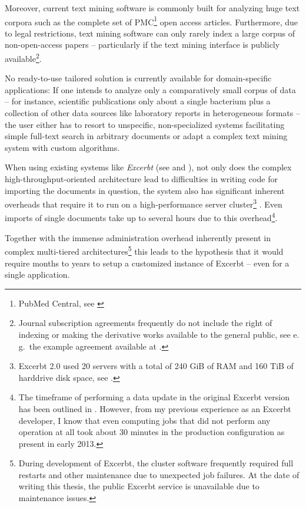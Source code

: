 \documentclass[a4paper, 12pt, twoside, reqn]{report}
\numberwithin{figure}{chapter}
\newtheorem[L]{boxedDefinition}{Definition}
\newtheorem[L]{boxedExample}{Example}
\newcommand{\eg}{e.\,g.\ }
\begin{document}
Moreover, current text mining software is commonly built for analyzing huge text corpora such as the complete set of PMC\footnote{PubMed Central, see \cite{beck2010report}} open access articles. Furthermore, due to legal restrictions, text mining software can only rarely index a large corpus of non-open-access papers -- particularly if the text mining interface is publicly available\footnote{Journal subscription agreements frequently do not include the right of indexing or making the derivative works available to the general public, see \eg the example agreement available at \cite{sciencedirect2012}.}.

No ready-to-use tailored solution is currently available for domain-specific applications: If one intends to analyze only a comparatively small corpus of data -- for instance, scientific publications only about a single bacterium plus a collection of other data sources like laboratory reports in heterogeneous formats -- the user either has to resort to unspecific, non-specialized systems facilitating simple full-text search in arbitrary documents or adapt a complex text mining system with custom algorithms.

When using existing systems like \textit{Excerbt} (see \cite{barnickel2009large} and \cite{wachinger2013next}), not only does the complex high-throughput-oriented architecture lead to difficulties in writing code for importing the documents in question, the system also has significant inherent overheads that require it to run on a high-performance server cluster\footnote{Excerbt 2.0 used 20 servers with a total of 240 GiB of RAM and 160 TiB of harddrive disk space, see \cite[section 4.2.1]{wachinger2013next}.} . Even imports of single documents take up to several hours due to this overhead\footnote{The timeframe of performing a data update in the original Excerbt version has been outlined in \cite[section 4.1]{wachinger2013next}. However, from my previous experience as an Excerbt developer, I know that even computing jobs that did not perform any operation at all took about 30 minutes in the production configuration as present in early 2013.}.

Together with the immense administration overhead inherently present in complex multi-tiered architectures\footnote{During development of Excerbt, the cluster software frequently required full restarts and other maintenance due to unexpected job failures. At the date of writing this thesis, the public Excerbt service \cite{excerbt} is unavailable due to maintenance issues.} this leads to the hypothesis that it would require months to years to setup a customized instance of Excerbt -- even for a single application.
  
\end{document}

